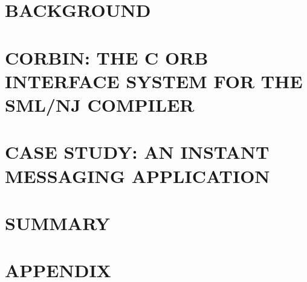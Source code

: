 \chapter{\uppercase{Background}}
\label{back}


\chapter[\uppercase{The C ORB Interface System for the SML/NJ Compiler}]%
        {\uppercase{CORBin: The C ORB Interface System for the SML/NJ Compiler}}
\label{implement}


\chapter{\uppercase{Case Study: An Instant Messaging Application}}
\label{study}


\chapter{\uppercase{Summary}}
\label{summary}


\chapter{\uppercase{Appendix}}
\label{appendix}


%

\newpage



